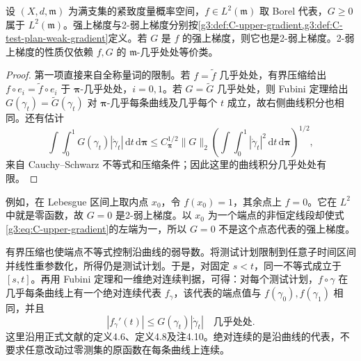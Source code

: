 \begin{proposition}\label{g3:prop:C-weak-gradient-representatives}
	设 \((X,d,\mathfrak m)\) 为满支集的紧致度量概率空间，\(f\in L^2(\mathfrak m)\) 取 Borel 代表，\(G\ge0\) 属于 \(L^2(\mathfrak m)\)。强上梯度与2-弱上梯度分别按\cref{g3:def:C-upper-gradient,g3:def:C-test-plan-weak-gradient}定义。若 \(G\) 是 \(f\) 的强上梯度，则它也是2-弱上梯度。2-弱上梯度的性质仅依赖 \(f,G\) 的 \(\mathfrak m\)-几乎处处等价类。
\end{proposition}
\begin{proof}
	第一项直接来自全称量词的限制。若 \(f=\widetilde f\) 几乎处处，有界压缩给出
	\(f\circ e_i=\widetilde f\circ e_i\) 于 \(\boldsymbol\pi\)-几乎处处，\(i=0,1\)。若 \(G=\widetilde G\) 几乎处处，则 Fubini 定理给出 \(G(\gamma_t)=\widetilde G(\gamma_t)\) 对 \(\boldsymbol\pi\)-几乎每条曲线及几乎每个 \(t\) 成立，故右侧曲线积分也相同。还有估计
	\begin{equation}\label{g3:eq:C-plan-integrability}
		\int\!\int_0^1G(\gamma_t)|\dot\gamma_t|\,\mathrm dt\,\mathrm d\boldsymbol\pi
		\le C_{\boldsymbol\pi}^{1/2}\|G\|_2
							\left(\int\!\int_0^1|\dot\gamma_t|^2\,\mathrm dt\,\mathrm d\boldsymbol\pi\right)^{1/2},
	\end{equation}
	来自 Cauchy--Schwarz 不等式和压缩条件；因此这里的曲线积分几乎处处有限。
\end{proof}

例如，在 Lebesgue 区间上取内点 \(x_0\)，令 \(f(x_0)=1\)，其余点上 \(f=0\)。它在 \(L^2\) 中就是零函数，故 \(G=0\) 是2-弱上梯度。以 \(x_0\) 为一个端点的非恒定线段却使式\eqref{g3:eq:C-upper-gradient}的左端为一，所以 \(G=0\) 不是这个点态代表的强上梯度。

\ProseParagraphBreak
有界压缩也使端点不等式控制沿曲线的弱导数。将测试计划限制到任意子时间区间并线性重参数化，所得仍是测试计划。于是，对固定 \(s<t\)，同一不等式成立于 \([s,t]\)。再用 Fubini 定理和一维绝对连续判据，可得：对每个测试计划，\(f\circ\gamma\) 在几乎每条曲线上有一个绝对连续代表 \(f_\gamma\)，该代表的端点值与 \(f(\gamma_0),f(\gamma_1)\) 相同，并且
\[
	|f_\gamma'(t)|\le G(\gamma_t)|\dot\gamma_t|
	\quad\text{几乎处处}.
\]
这里沿用正式文献的定义4.6、定义4.8及注4.10\cite[第981--982页]{AmbrosioGigliSavare2013WeakGradients}。绝对连续的是沿曲线的代表，不要求任意改动过零测集的原函数在每条曲线上连续。

